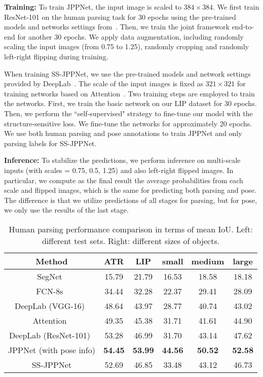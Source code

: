 \documentclass[10pt,journal,compsoc]{IEEEtran}
\begin{document}
\textbf{Training: }
To train JPPNet, the input image is scaled to $384 \times 384$. We first train ResNet-101 on the human parsing task for 30 epochs using the pre-trained models and networks settings from~\cite{chen2016deeplab}. Then, we train the joint framework end-to-end for another 30 epochs. We apply data augmentation, including randomly scaling the input images (from 0.75 to 1.25), randomly cropping and randomly left-right flipping during training.

When training SS-JPPNet, we use the pre-trained models and network settings provided by DeepLab~\cite{chen2016deeplab}. The scale of the input images is fixed as $321 \times 321$ for training networks based on Attention~\cite{chen2015attention}. Two training steps are employed to train the networks. First, we train the basic network on our LIP dataset for 30 epochs. Then, we perform the ``self-supervised" strategy to fine-tune our model with the structure-sensitive loss. We fine-tune the networks for approximately 20 epochs. We use both human parsing and pose annotations to train JPPNet and only parsing labels for SS-JPPNet.

\textbf{Inference: }
To stabilize the predictions, we perform inference on multi-scale inputs (with scales = {0.75, 0.5, 1.25}) and also left-right flipped images. In particular, we compute as the final result the average probabilities from each scale and flipped images, which is the same for predicting both parsing and pose. The difference is that we utilize predictions of all stages for parsing, but for pose, we only use the results of the last stage.


\begin{table}[t]
\centering
\scriptsize
\caption{Human parsing performance comparison in terms of mean IoU. Left: different test sets. Right: different sizes of objects.}
\vspace{-3mm}
\label{tab: lip_size}
\begin{tabular}{c|cc|ccc}
\toprule[0.5pt]
Method                                     & ATR     & LIP      & small   & medium   & large     \\ \hline 
SegNet~\cite{badrinarayanan2015segnet}     & 15.79   & 21.79    & 16.53   & 18.58    & 18.18     \\
FCN-8s~\cite{long2014fully}                & 34.44   & 32.28    & 22.37   & 29.41    & 28.09     \\ 
DeepLab (VGG-16)~\cite{chen2016deeplab}     & 48.64   & 43.97    & 28.77   & 40.74    & 43.02    \\
Attention~\cite{chen2015attention}         & 49.35   & 45.38    & 31.71   & 41.61    & 44.90     \\ 
DeepLab (ResNet-101)~\cite{chen2016deeplab} & 53.28   & 46.99    & 31.70   & 43.14    & 47.62    \\ \hline
JPPNet  (with pose info)   & \textbf{54.45} & \textbf{53.99} & \textbf{44.56} & \textbf{50.52} & \textbf{52.58}    \\
SS-JPPNet                            & 52.69   & 46.85    & 33.48   & 43.12    & 46.73     \\
\toprule[0.5pt]
\end{tabular}
\end{table}
\end{document}
